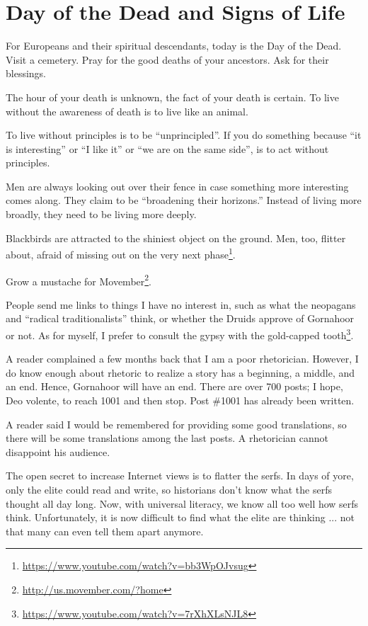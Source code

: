 \section{Day of the Dead and Signs of Life}

For Europeans and their spiritual descendants, today is the Day of the Dead. Visit a cemetery. Pray for the good deaths of your ancestors. Ask for their blessings.

The hour of your death is unknown, the fact of your death is certain. To live without the awareness of death is to live like an animal.

To live without principles is to be ``unprincipled''. If you do something because ``it is interesting'' or ``I like it'' or ``we are on the same side'', is to act without principles.

Men are always looking out over their fence in case something more interesting comes along. They claim to be ``broadening their horizons.'' Instead of living more broadly, they need to be living more deeply.

Blackbirds are attracted to the shiniest object on the ground. Men, too, flitter about, afraid of missing out on the very next phase\footnote{\url{https://www.youtube.com/watch?v=bb3WpOJvsug}}.

Grow a mustache for Movember\footnote{\url{http://us.movember.com/?home}}.

People send me links to things I have no interest in, such as what the neopagans and ``radical traditionalists'' think, or whether the Druids approve of Gornahoor or not. As for myself, I prefer to consult the gypsy with the gold-capped tooth\footnote{\url{https://www.youtube.com/watch?v=7rXhXLsNJL8}}.

A reader complained a few months back that I am a poor rhetorician. However, I do know enough about rhetoric to realize a story has a beginning, a middle, and an end. Hence, Gornahoor will have an end. There are over 700 posts; I hope, Deo volente, to reach 1001 and then stop. Post \#1001 has already been written.

A reader said I would be remembered for providing some good translations, so there will be some translations among the last posts. A rhetorician cannot disappoint his audience.

The open secret to increase Internet views is to flatter the serfs. In days of yore, only the elite could read and write, so historians don't know what the serfs thought all day long. Now, with universal literacy, we know all too well how serfs think. Unfortunately, it is now difficult to find what the elite are thinking ... not that many can even tell them apart anymore.

